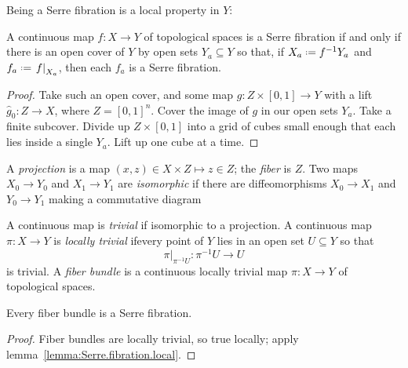 Being a Serre fibration is a local property in \(Y\):
\begin{lemma}\label{lemma:Serre.fibration.local}
A continuous map \(f \colon X \to Y\) of topological spaces is a Serre fibration if and only if there is an open cover of \(Y\) by open sets \(Y_a \subseteq Y\) so that, if \(X_a\defeq f^{-1}Y_a\) and \(f_a \defeq \left.f\right|_{X_a}\), then each \(f_a\) is a Serre fibration.
\end{lemma}
\begin{proof}
Take such an open cover, and some map \(g \colon Z \times [0,1] \to Y\) with a lift \(\hat{g}_0 \colon Z \to X\), where \(Z=[0,1]^n\).
Cover the image of \(g\) in our open sets \(Y_a\).
Take a finite subcover.
Divide up \(Z\times [0,1]\) into a grid of cubes small enough that each lies inside a single \(Y_a\).
Lift up one cube at a time.
\end{proof}
A \emph{projection} is a map \((x,z)\in X \times Z\mapsto z \in Z\); the \emph{fiber} is \(Z\).
Two maps \(X_0 \to Y_0\) and \(X_1\to Y_1\) are \emph{isomorphic} if there are diffeomorphisms \(X_0 \to X_1\) and \(Y_0\to Y_1\)  making a commutative diagram
A continuous map is \emph{trivial} if isomorphic to a projection.
A continuous map \(\pi\colon X \to Y\) is \emph{locally trivial} ifevery point of \(Y\) lies in an open set \(U\subseteq Y\)  so that 
\[
\left.\pi\right|_{\pi^{-1}U}\colon \pi^{-1}U \to U
\]
is trivial.
A \emph{fiber bundle} is a continuous locally trivial map \(\pi\colon X \to Y\) of topological spaces.
\begin{lemma}
Every fiber bundle is a Serre fibration.
\end{lemma}
\begin{proof}
Fiber bundles are locally trivial, so true locally; apply lemma~\vref{lemma:Serre.fibration.local}.
\end{proof}
